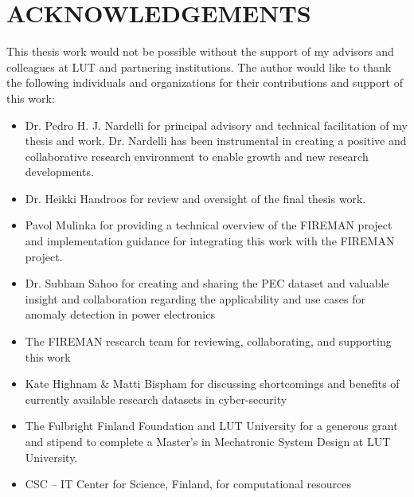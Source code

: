 \section*{\MakeUppercase{Acknowledgements}}
\thispagestyle{empty}
{}%

This thesis work would not be possible without the support of my advisors and colleagues at LUT and partnering institutions. The author would like to thank the following individuals and organizations for their contributions and support of this work:

\begin{itemize}
    \item Dr. Pedro H. J. Nardelli for principal advisory and technical facilitation of my thesis and work. Dr. Nardelli has been instrumental in creating a positive and collaborative research environment to enable growth and new research developments.
    \item Dr. Heikki Handroos for review and oversight of the final thesis work.
    \item Pavol Mulinka for providing a technical overview of the FIREMAN project and implementation guidance for integrating this work with the FIREMAN project.
    \item Dr. Subham Sahoo for creating and sharing the PEC dataset and valuable insight and collaboration regarding the applicability and use cases for anomaly detection in power electronics
    \item The FIREMAN research team for reviewing, collaborating, and supporting this work
    \item Kate Highnam \& Matti Bispham for discussing shortcomings and benefits of currently available research datasets in cyber-security
    \item The Fulbright Finland Foundation and LUT University for a generous grant and stipend to complete a Master's in Mechatronic System Design at LUT University. 
	\item CSC – IT Center for Science, Finland, for computational resources
\end{itemize}
